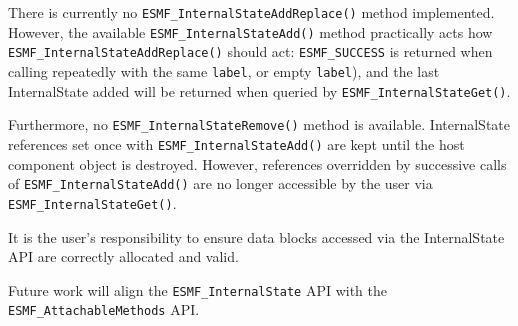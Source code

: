 %


There is currently no {\tt ESMF\_InternalStateAddReplace()} method implemented. However, the available {\tt ESMF\_InternalStateAdd()} method practically acts how {\tt ESMF\_InternalStateAddReplace()} should act: {\tt ESMF\_SUCCESS} is returned when calling repeatedly with the same {\tt label}, or empty {\tt label}), and the last InternalState added will be returned when queried by {\tt ESMF\_InternalStateGet()}.

Furthermore, no {\tt ESMF\_InternalStateRemove()} method is available. InternalState references set once with {\tt ESMF\_InternalStateAdd()} are kept until the host component object is destroyed. However, references overridden by successive calls of {\tt ESMF\_InternalStateAdd()} are no longer accessible by the user via {\tt ESMF\_InternalStateGet()}.

It is the user's responsibility to ensure data blocks accessed via the InternalState API are correctly allocated and valid.

Future work will align the {\tt ESMF\_InternalState} API with the {\tt ESMF\_AttachableMethods} API.
